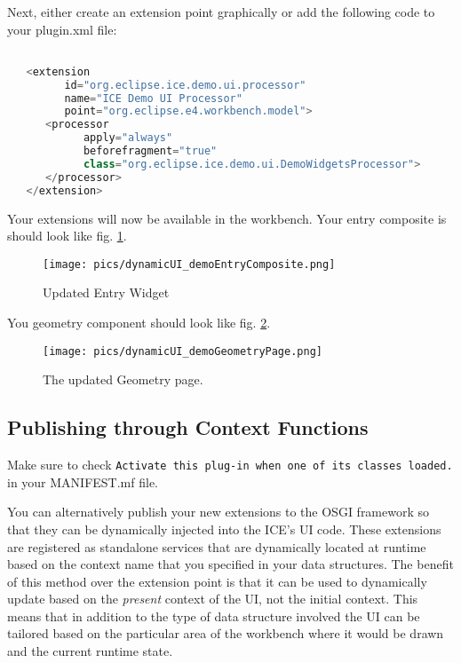 Next, either create an extension point graphically or add the following code to
your plugin.xml file:

\begin{lstlisting}[language=java]

   <extension
         id="org.eclipse.ice.demo.ui.processor"
         name="ICE Demo UI Processor"
         point="org.eclipse.e4.workbench.model">
      <processor
            apply="always"
            beforefragment="true"
            class="org.eclipse.ice.demo.ui.DemoWidgetsProcessor">
      </processor>
   </extension>

\end{lstlisting}

Your extensions will now be available in the workbench. Your entry composite is
should look like fig. \ref{fig:iceDemoEntryComposite}.

\begin{figure}[h]
\texttt{[image: pics/dynamicUI\_demoEntryComposite.png]}
\caption{Updated Entry Widget}
\label{fig:iceDemoEntryComposite}
\end{figure}

You geometry component should look like fig. \ref{fig:iceDemoGeometryPage}.

\begin{figure}[h]
\texttt{[image: pics/dynamicUI\_demoGeometryPage.png]}
\caption{The updated Geometry page.}
\label{fig:iceDemoGeometryPage}
\end{figure}

\subsection{Publishing through Context Functions}

Make sure to check \texttt{Activate this plug-in when one of its classes
loaded.} in your MANIFEST.mf file.

You can alternatively publish your new extensions to the OSGI framework so that
they can be dynamically injected into the ICE's UI code. These extensions are
registered as standalone services that are dynamically located at runtime based
on the context name that you specified in your data structures. The benefit of
this method over the extension point is that it can be used to dynamically
update based on the \textit{present} context of the UI, not the initial
context. This means that in addition to the type of data structure involved the
UI can be tailored based on the particular area of the workbench where it would
be drawn and the current runtime state.

